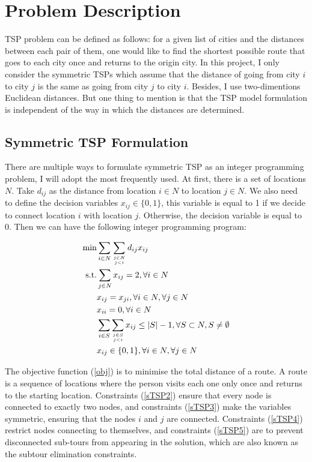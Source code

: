 \documentclass[12pt,letterpaper]{article}
\begin{document}
\section{Problem Description}\label{section-problem}
TSP problem can be defined as follows: for a given list of cities and the distances between each pair of them, one would like to find the shortest possible route that goes to each city once and returns to the origin city. In this project, I only consider the symmetric TSPs which assume that the distance of going from city $i$ to city $j$ is the same as going from city $j$ to city $i$. Besides, I use two-dimentions Euclidean distances. But one thing to mention is that the TSP model formulation is independent of the way in which the distances are determined.

\subsection{Symmetric TSP Formulation}
There are multiple ways to formulate symmetric TSP as an integer programming problem, I will adopt the most frequently used.
At first, there is a set of locations $N$. Take $d_{ij}$ as the distance from location $i\in N$ to location $j \in N$. We also need to define the decision variables $x_{ij} \in \{0,1\}$, this variable is equal to 1 if we decide to connect location $i$ with location $j$. Otherwise, the decision variable is equal to 0. Then we can have the following integer programming program:

\begin{alignat}{2}
\min & \sum_{i \in N} \sum_{j \in N \atop j<i} d_{i j} x_{i j} \label{obj} \\
\mbox{s.t.}
&\sum_{j \in N} x_{i j}=2, \forall i \in N \label{sTSP2} \\
&x_{i j}=x_{j i}, \forall i \in N, \forall j \in N \label{sTSP3} \\
&x_{i i}=0, \forall i \in N \label{sTSP4}\\
&\sum_{i \in S} \sum_{j \in S \atop j<i} x_{i j} \leq|S|-1, \forall S \subset N, S \neq \emptyset \label{sTSP5}\\
& x_{i j} \in\{0,1\},\forall i \in N, \forall j \in N
\end{alignat}

The objective function (\ref{obj}) is to minimise the total distance of a route. A route is a sequence of locations where the person visits each one only once and returns to the starting location.
Constraints (\ref{sTSP2}) ensure that every node is
connected to exactly two nodes, and constraints (\ref{sTSP3}) make the variables symmetric, ensuring that the nodes $i$ and $j$ are connected. Constraints (\ref{sTSP4}) restrict nodes connecting to themselves, and
constraints (\ref{sTSP5}) are to prevent disconnected sub-tours from appearing in the solution, which are also known as the subtour elimination constraints.
\end{document}
